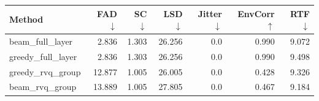 \begin{tabular}{lrrrrrr}
\toprule
Method & FAD$\downarrow$ & SC$\downarrow$ & LSD$\downarrow$ & Jitter$\downarrow$ & EnvCorr$\uparrow$ & RTF$\downarrow$ \\
\midrule
beam\_full\_layer & 2.836 & 1.303 & 26.256 & 0.0 & 0.990 & 9.072 \\
greedy\_full\_layer & 2.836 & 1.303 & 26.256 & 0.0 & 0.990 & 9.498 \\
greedy\_rvq\_group & 12.877 & 1.005 & 26.005 & 0.0 & 0.428 & 9.326 \\
beam\_rvq\_group & 13.889 & 1.005 & 27.805 & 0.0 & 0.467 & 9.184 \\
\bottomrule
\end{tabular}
